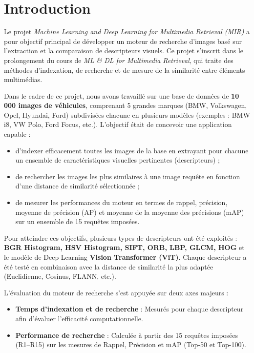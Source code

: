 \documentclass[a4paper,12pt]{report}%
\begin{document}
\tableofcontents

\chapter{Introduction}
Le projet \textit{Machine Learning and Deep Learning for Multimedia Retrieval (MIR)} a pour objectif principal de développer un moteur de recherche d’images basé sur l’extraction et la comparaison de descripteurs visuels. Ce projet s’inscrit dans le prolongement du cours de \textit{ML \& DL for Multimedia Retrieval}, qui traite des méthodes d’indexation, de recherche et de mesure de la similarité entre éléments multimédias.

Dans le cadre de ce projet, nous avons travaillé sur une base de données de \textbf{10 000 images de véhicules}, comprenant 5 grandes marques (BMW, Volkswagen, Opel, Hyundai, Ford) subdivisées chacune en plusieurs modèles (exemples : BMW i8, VW Polo, Ford Focus, etc.). L’objectif était de concevoir une application capable :
\begin{itemize}
    \item d’indexer efficacement toutes les images de la base en extrayant pour chacune un ensemble de caractéristiques visuelles pertinentes (descripteurs) ;
    \item de rechercher les images les plus similaires à une image requête en fonction d’une distance de similarité sélectionnée ;
    \item de mesurer les performances du moteur en termes de rappel, précision, moyenne de précision (AP) et moyenne de la moyenne des précisions (mAP) sur un ensemble de 15 requêtes imposées.
\end{itemize}

Pour atteindre ces objectifs, plusieurs types de descripteurs ont été exploités : \textbf{BGR Histogram, HSV Histogram, SIFT, ORB, LBP, GLCM, HOG} et le modèle de Deep Learning \textbf{Vision Transformer (ViT)}. Chaque descripteur a été testé en combinaison avec la distance de similarité la plus adaptée (Euclidienne, Cosinus, FLANN, etc.).

L’évaluation du moteur de recherche s’est appuyée sur deux axes majeurs :
\begin{itemize}
    \item \textbf{Temps d’indexation et de recherche} : Mesurés pour chaque descripteur afin d’évaluer l’efficacité computationnelle.
    \item \textbf{Performance de recherche} : Calculée à partir des 15 requêtes imposées (R1--R15) sur les mesures de Rappel, Précision et mAP (Top-50 et Top-100).
\end{itemize}
\end{document}
